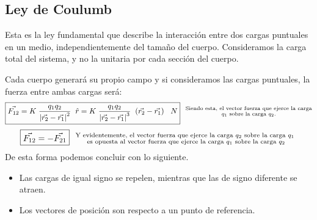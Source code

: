 \subsection{Ley de Coulumb}
Esta es la ley fundamental que describe la interacción entre dos cargas puntuales en un medio, independientemente del tamaño del cuerpo. Consideramos la carga total del sistema, y no la unitaria por cada sección del cuerpo. \par
\hspace{4cm}
 \par
Cada cuerpo generará su propio campo y si consideramos las cargas puntuales, la fuerza entre ambas cargas será:
\[
        \boxed{\vec{F_{12}} = K \hspace{1mm}\frac{q_1q_2}{\left | \vec{r_2} - \vec{r_1} \right |^2}\hspace{2mm}\hat{r} = K \hspace{1mm}\frac{q_1q_2}{\left | \vec{r_2} - \vec{r_1} \right |^3}\hspace{2mm}(\vec{r_2} - \vec{r_1}) \hspace{3mm}N} \hspace{.25cm}
        \substack{\textnormal{\scriptsize{Siendo esta, el vector fuerza que ejerce la carga}} \\
                \textnormal{\(q_1\) sobre la carga \(q_2\).}}
\]
\[
        \boxed{\vec{F_{12}} = -\vec{F_{21}}} \hspace{.25cm}
        \substack{
                \textnormal{\scriptsize{Y evidentemente, el vector fuerza que ejerce la carga \(q_2\) sobre la carga \(q_1\) }}\\
                \textnormal{\scriptsize{es opuesta al vector fuerza que ejerce la carga \(q_1\) sobre la carga \(q_2\)}}
        }
\]
\newline
De esta forma podemos concluir con lo siguiente.
\begin{itemize}
        \item Las cargas de igual signo se repelen, mientras que las de signo diferente se atraen.
        \item Los vectores de posición son respecto a un punto de referencia.
\end{itemize}
